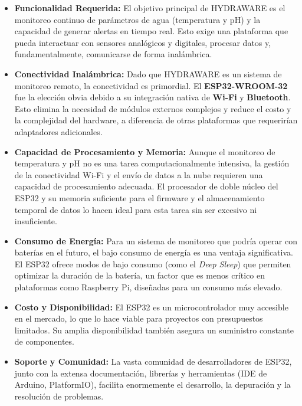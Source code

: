 \documentclass[a4paper,12pt]{article}
\begin{document}
	\begin{itemize}
		\item \textbf{Funcionalidad Requerida:} El objetivo principal de HYDRAWARE es el monitoreo continuo de parámetros de agua (temperatura y pH) y la capacidad de generar alertas en tiempo real. Esto exige una plataforma que pueda interactuar con sensores analógicos y digitales, procesar datos y, fundamentalmente, comunicarse de forma inalámbrica.
		
		\item \textbf{Conectividad Inalámbrica:} Dado que HYDRAWARE es un sistema de monitoreo remoto, la conectividad es primordial. El \textbf{ESP32-WROOM-32} fue la elección obvia debido a su integración nativa de \textbf{Wi-Fi} y \textbf{Bluetooth}. Esto elimina la necesidad de módulos externos complejos y reduce el costo y la complejidad del hardware, a diferencia de otras plataformas que requerirían adaptadores adicionales.
		
		\item \textbf{Capacidad de Procesamiento y Memoria:} Aunque el monitoreo de temperatura y pH no es una tarea computacionalmente intensiva, la gestión de la conectividad Wi-Fi y el envío de datos a la nube requieren una capacidad de procesamiento adecuada. El procesador de doble núcleo del ESP32 y su memoria suficiente para el firmware y el almacenamiento temporal de datos lo hacen ideal para esta tarea sin ser excesivo ni insuficiente.
		
		\item \textbf{Consumo de Energía:} Para un sistema de monitoreo que podría operar con baterías en el futuro, el bajo consumo de energía es una ventaja significativa. El ESP32 ofrece modos de bajo consumo (como el \textit{Deep Sleep}) que permiten optimizar la duración de la batería, un factor que es menos crítico en plataformas como Raspberry Pi, diseñadas para un consumo más elevado.
		
		\item \textbf{Costo y Disponibilidad:} El ESP32 es un microcontrolador muy accesible en el mercado, lo que lo hace viable para proyectos con presupuestos limitados. Su amplia disponibilidad también asegura un suministro constante de componentes.
		
		\item \textbf{Soporte y Comunidad:} La vasta comunidad de desarrolladores de ESP32, junto con la extensa documentación, librerías y herramientas (IDE de Arduino, PlatformIO), facilita enormemente el desarrollo, la depuración y la resolución de problemas.
	\end{itemize}
	
\end{document}
